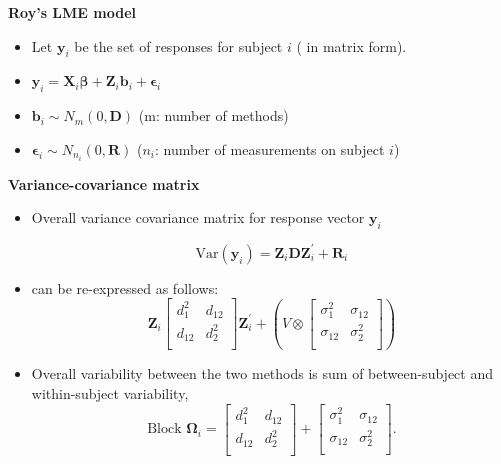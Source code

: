 \documentclass[compress]{beamer}        %
\makeatletter
\newcommand{\tcb}{\textcolor{beamer@blendedblue}}
\makeatother
\begin{document}
		\begin{frame}{\bf \tcb{Roy's LME model}}
			\large
			\begin{itemize}\itemsep0.7cm
				
				\item Let $\boldsymbol{y}_i$ be the set of responses for subject $i$ ( in matrix form).
				\item $\boldsymbol{y}_i = \boldsymbol{X}_i\boldsymbol{\beta} + \boldsymbol{Z}_i \boldsymbol{b}_i + \boldsymbol{\epsilon}_i$
				\item $\boldsymbol{b}_i \sim N_m(0,\boldsymbol{D})$  (m: number of methods)
				\item $\boldsymbol{\epsilon}_i \sim N_{n_i}(0,\boldsymbol{R})$ ($n_i$: number of measurements on subject $i$)
			\end{itemize}
		\end{frame}
		
		
		
		\begin{frame}{\bf \tcb{Variance-covariance matrix}}
			\begin{itemize}
				\item Overall variance covariance matrix for response vector $\boldsymbol{y}_i$
				
				\[ \mbox{Var}(\boldsymbol{y}_i)= \boldsymbol{Z}_i \boldsymbol{D}\boldsymbol{Z}^{\prime}_i + \boldsymbol{R}_i \]
				
				\item can be re-expressed as follows:
				\[\boldsymbol{Z}_i \left[ \begin{array}{cc} d^2_1 & d_{12}\\
				d_{12} & d^2_2\\ \end{array}\right]\boldsymbol{Z}^{\prime}_i  +  \left(V \otimes \left[\begin{array}{cc} \sigma^2_1 & \sigma_{12}\\
				\sigma_{12} & \sigma^2_2\\ \end{array}\right] \right)
				\]
				
				\item Overall variability between the two methods is sum of between-subject and within-subject variability,
				\[
				\mbox{Block } \boldsymbol{\Omega}_i = \left[ \begin{array}{cc} d^2_1 & d_{12}\\ d_{12} & d^2_2\\ \end{array} \right]
				+ \left[\begin{array}{cc} \sigma^2_1 & \sigma_{12}\\ \sigma_{12} & \sigma^2_2\\ \end{array}\right].
				\]
				
			\end{itemize}
		\end{frame}
		
\end{document}
